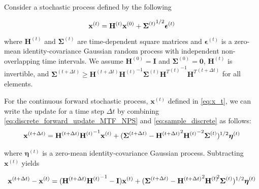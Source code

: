 \documentclass[12pt,]{article}
\begin{document}
Consider a stochastic process defined by the following 

\begin{equation}
\mathbf{x}^{(t)} = \mathbf{H}^{(t)} \mathbf{x}^{(0)} + {\boldsymbol{\Sigma}^{(t)}}^{\hspace{0mm}  1/2} \boldsymbol{\epsilon}^{(t)} 
\label{eq:x_t_general}
\end{equation}

\noindent where $\mathbf{H}^{(t)}$ and $\boldsymbol{\Sigma}^{(t)}$ are time-dependent square matrices and $\boldsymbol{\epsilon}^{(t)}$ is a zero-mean identity-covariance Gaussian random process with independent non-overlapping time intervals. We assume $\mathbf{H}^{(0)} = \mathbf{I}$ and $\boldsymbol{\Sigma}^{(0)} = \mathbf{0}$, $\mathbf{H}^{(t)}$ is invertible, and $\boldsymbol{\Sigma}^{(t+\Delta t)}\geq \mathbf{H}^{(t+\Delta t)}{\mathbf{H}^{(t)}}^{-1}\boldsymbol{\Sigma}^{(t)}{{\mathbf{H}^T}^{(t)}}^{-1} {\mathbf{H}^T}^{(t+\Delta t)}$ for all elements. 


For the continuous forward stochastic process, $\mathbf{x}^{(t)}$ defined in  \eqref{eq:x_t}, we can write the update for a time step $\Delta t$ by combining \eqref{eq:discrete_forward_update_MTF_NPS} and \eqref{eq:sample_discrete} as follows:
\begin{gather}
    \mathbf{x}^{(t+\Delta t)} = \mathbf{H}^{(t + \Delta t)} {\mathbf{H}^{(t)}}^{\hspace{0mm}-1} \mathbf{x}^{(t)} + (\boldsymbol{\Sigma}^{(t + \Delta t)} -  {\mathbf{H}^{(t + \Delta t)}}^{\hspace{-0mm} 2} {\mathbf{H}^{(t)}}^{\hspace{0mm}-2} \boldsymbol{\Sigma}^{(t)} )^{1/2} \boldsymbol{\eta}^{(t)}
    \label{eq:x_t_plus_delta_t}
\end{gather}

\noindent where $\boldsymbol{\eta}^{(t)}$ is a zero-mean identity-covariance Gaussian  process. Subtracting $\mathbf{x}^{(t)}$ yields

\begin{gather}
    \mathbf{x}^{(t + \Delta t)} - \mathbf{x}^{(t)}  =  (\mathbf{H}^{(t + \Delta t)} {\mathbf{H}^{(t)}}^{\hspace{0mm}-1} - \mathbf{I}) \mathbf{x}^{(t)} + (\boldsymbol{\Sigma}^{(t + \Delta t)} -  {\mathbf{H}^{(t+\Delta t)}}^{\hspace{-0mm} 2} {\mathbf{H}^{(t)}}^{\hspace{-3mm}-2} \boldsymbol{\Sigma}^{(t)} )^{1/2} \boldsymbol{\eta}^{(t)}
    \label{eq:x_t_difference}
\end{gather}
\end{document}
